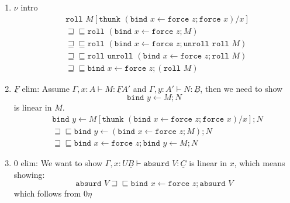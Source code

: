 \documentclass[acmsmall,screen,12pt]{acmart}
\renewcommand{\u}{\underline}
\newcommand{\pipe}{\,\,|\,\,}
\newcommand{\ltdyn}{\sqsubseteq}
\newcommand{\gtdyn}{\sqsupseteq}
\newcommand{\equidyn}{\mathrel{\gtdyn\ltdyn}}
\newcommand{\pair}[2]{\{ \pi \mapsto {#1} \pipe \pi' \mapsto {#2}\}}
\newcommand{\pairone}[1]{\{ \pi \mapsto {#1}}
\newcommand{\pairtwo}[1]{\pipe \pi' \mapsto {#1}\}}
\newcommand{\roll}{\kw{roll}}
\newcommand{\unroll}{\kw{unroll}}
\newcommand{\bindXtoYinZ}[2]{\kw{bind}#2 \leftarrow #1;}
\newcommand{\kw}[1]{\texttt{#1}\,\,}
\newcommand{\absurd}{\kw{absurd}}
\newcommand{\thunk}{\kw{thunk}}
\newcommand{\force}{\kw{force}}
\newcommand{\with}{\mathbin{\&}}
\begin{document}
{\begin{longonly}
\begin{longproof}
\begin{enumerate}
\begin{align*}
      &\pairtwo{N[\thunk {(\bindXtoYinZ {\force z} x \force x)}/x]}\\
      &\equidyn \pairone{\bindXtoYinZ {\force z} x M}\tag{$M, N$ linear}\\
      &\qquad    \pairtwo{\bindXtoYinZ {\force z} x N}\\
      &\equidyn \pairone{\bindXtoYinZ {\force z} x {\pi \pair M N}}\tag{$\with\beta$}\\
      &\qquad    \pairtwo{\bindXtoYinZ {\force z} x {\pi' \pair M N}}\\
      &\equidyn \pairone{\pi({\bindXtoYinZ {\force z} x \pair M N})}\tag{$\u F\eta$}\\
      &\qquad    \pairtwo{\pi'({\bindXtoYinZ {\force z} x \pair M N})}\\
      &\equidyn \bindXtoYinZ {\force z} x \pair M N\tag{$\with\eta$}
    \end{align*}
  \item $\nu$ intro
    \begin{align*}
      & \roll M[\thunk{(\bindXtoYinZ {\force z} x \force x)}/x]\\
      &\equidyn \roll (\bindXtoYinZ {\force z} x M) \tag{$M$ is linear} \\
      &\equidyn \roll (\bindXtoYinZ {\force z} x \unroll \roll M) \tag{$\nu\beta$}\\
      &\equidyn \roll \unroll (\bindXtoYinZ {\force z} x \roll M) \tag{$\u F\eta$}\\
      &\equidyn \bindXtoYinZ {\force z} x (\roll M) \tag{$\nu\eta$}
    \end{align*}
  \item $\u F$ elim: Assume $\Gamma, x : A \vdash M : \u F A'$ and
    $\Gamma, y : A' \vdash N : \u B$, then we need to show
    \[ \bindXtoYinZ M y N \]
    is linear in $M$.
    \begin{align*}
      & \bindXtoYinZ {M[\thunk{(\bindXtoYinZ {\force z} x \force x)}/x]} y N\\
      & \equidyn
      \bindXtoYinZ {(\bindXtoYinZ {\force z} x M)} y N\tag{$M$ is linear}\\
      &\equidyn
      \bindXtoYinZ {\force z} x \bindXtoYinZ M y N\tag{$\u F\eta$}
    \end{align*}
  \item $0$ elim: We want to show $\Gamma, x:U\u B \vdash \absurd V :
    \u C$ is linear in $x$, which means showing:
    \[ \absurd V \equidyn \bindXtoYinZ {\force z} x \absurd V
    \]
    which follows from $0\eta$

\end{enumerate}
\end{longproof}
\end{longonly}}
\end{document}
